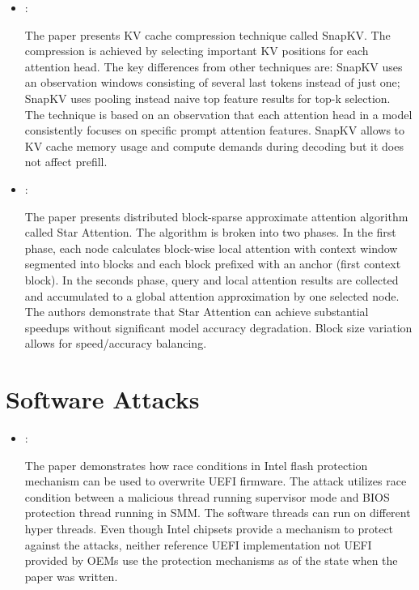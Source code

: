 \begin{itemize}
    \item \cite{Li:SnapKV:2024}:

    The paper presents KV cache compression technique called SnapKV. The compression is achieved by selecting important KV positions for each attention head. The key differences from other techniques are: SnapKV uses an observation windows consisting of several last tokens instead of just one; SnapKV uses pooling instead naive top feature results for top-k selection. The technique is based on an observation that each attention head in a model consistently focuses on specific prompt attention features. SnapKV allows to KV cache memory usage and compute demands during decoding but it does not affect prefill.

    \item \cite{Acharya:StarAttention:2025}:

    The paper presents distributed block-sparse approximate attention algorithm called Star Attention. The algorithm is broken into two phases. In the first phase, each node calculates block-wise local attention with context window segmented into blocks and each block prefixed with an anchor (first context block). In the seconds phase, query and local attention results are collected and accumulated to a global attention approximation by one selected node. The authors demonstrate that Star Attention can achieve substantial speedups without significant model accuracy degradation. Block size variation allows for speed/accuracy balancing.
\end{itemize}

\section*{Software Attacks}

\begin{itemize}
    \item \cite{Kallenberg:SpeedRacer:2014}:

    The paper demonstrates how race conditions in Intel flash protection mechanism can be used to overwrite UEFI firmware. The attack utilizes race condition between a malicious thread running supervisor mode and BIOS protection thread running in SMM. The software threads can run on different hyper threads. Even though Intel chipsets provide a mechanism to protect against the attacks, neither reference UEFI implementation not UEFI provided by OEMs use the protection mechanisms as of the state when the paper was written.
\end{itemize}

